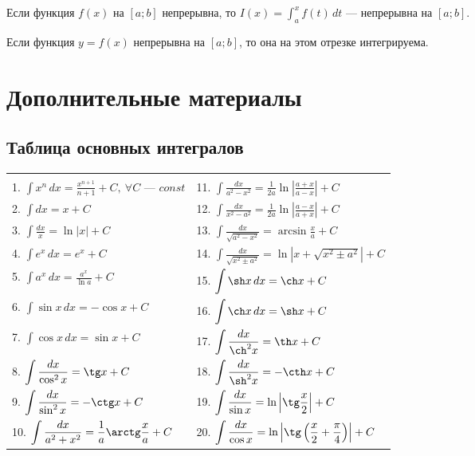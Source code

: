 \begin{theorem}[Непрерывность $I(x)$]
    Если функция $f(x)$ на $[a;b]$ непрерывна, то $I(x) = \int_{a}^{x} f(t)\, dt$ --- непрерывна на $[a;b]$.
\end{theorem}

\begin{theorem}
    Если функция $y=f(x)$ непрерывна на $[a;b]$, то она на этом отрезке интегрируема.
\end{theorem}

\newpage
\section{Дополнительные материалы}

\subsection{Таблица основных интегралов}

\begin{table}[h]
    \centering
    \begin{tabular}{|ll|}
        \hline
         & \\[-8pt]
        1. $\displaystyle \int x^n \, dx = \frac{x^{n+1}}{n+1} + C,\ \forall C \text{ --- } const$ & 11. $\displaystyle \int \frac{dx}{a^2 - x^2} = \frac{1}{2a}\ln \left| \frac{a+x}{a-x} \right| + C$ \\[2ex]
        2. $\displaystyle \int dx = x + C$ & 12. $\displaystyle \int \frac{dx}{x^2 - a^2} = \frac{1}{2a}\ln \left| \frac{a-x}{a+x} \right| + C$ \\[2ex]
        3. $\displaystyle \int \frac{dx}{x} = \ln |x| + C$ & 13. $\displaystyle \int \frac{dx}{\sqrt{a^2 - x^2}} = \arcsin \frac{x}{a} + C$ \\[2ex]
        4. $\displaystyle \int e^x\, dx = e^x + C$ & 14. $\displaystyle \int \frac{dx}{\sqrt{x^2 \pm a^2}} = \ln \left|x + \sqrt{x^2 \pm a^2}\right| + C$ \\[2ex]
        5. $\displaystyle \int a^x\, dx = \frac{a^x}{\ln a} + C$ & 15. $\displaystyle \int \sh x\, dx = \ch x + C$\\[2ex]
        6. $\displaystyle \int \sin x\, dx = -\cos x + C$ & 16. $\displaystyle \int \ch x\, dx = \sh x + C$ \\[2ex]
        7. $\displaystyle \int \cos x\, dx = \sin x + C$ & 17. $\displaystyle \int \frac{dx}{\ch^2x} = \th x + C$ \\[2ex]
        8. $\displaystyle \int \frac{dx}{\cos^2x} = \tg x + C$ & 18. $\displaystyle \int \frac{dx}{\sh^2x} = - \cth x + C$\\[2ex]
        9. $\displaystyle \int \frac{dx}{\sin^2x} = -\ctg x + C$ & 19. $\displaystyle \int \frac{dx}{\sin x} = \ln \left| \tg \frac{x}{2} \right| + C$ \\[2ex]
        10. $\displaystyle \int \frac{dx}{a^2 + x^2} = \frac{1}{a}\arctg \frac{x}{a} + C$ & 20. $\displaystyle \int \frac{dx}{\cos x} = \ln \left| \tg \left(\frac{x}{2} + \frac{\pi}{4}\right) \right| + C$ \\[2ex]
        \hline
    \end{tabular}
\end{table}

